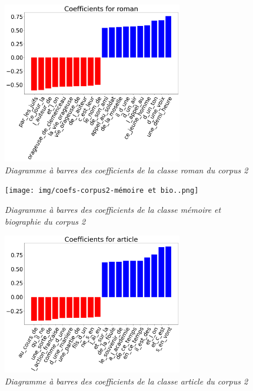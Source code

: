 \begin{figure}[H]
\centering %
\includegraphics[width=0.70\textwidth]{img/coefs-corpus2-roman.png}
\caption{\textit{Diagramme à barres des coefficients de la classe roman du corpus 2}}
\label{'fig:coefs-corpus2-roman'}
\end{figure}

\begin{figure}[H]
\centering %
\texttt{[image: img/coefs-corpus2-mémoire et bio..png]}
\caption{\textit{Diagramme à barres des coefficients de la classe mémoire et biographie du corpus 2}}
\label{'fig:coefs-corpus2-mémoire et bio.'}
\end{figure}

\begin{figure}[H]
\centering %
\includegraphics[width=0.70\textwidth]{img/coefs-corpus2-article.png}
\caption{\textit{Diagramme à barres des coefficients de la classe article du corpus 2}}
\label{'fig:coefs-corpus2-article'}
\end{figure}

